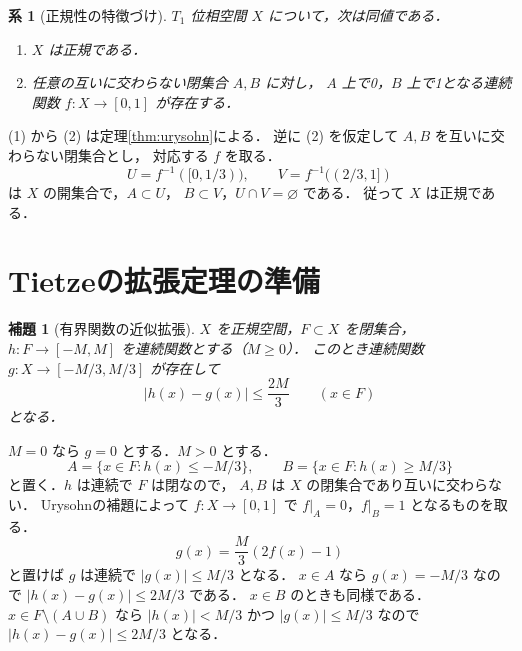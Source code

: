 \documentclass[a5paper,10pt,onecolumn]{jsarticle}
\makeatletter
\theoremstyle{mathnotetheorem}
\newtheorem{lemma}[theorem]{補題}
\newtheorem{corollary}[theorem]{系}
\renewcommand{\proofname}{証明}
\renewenvironment{proof}[1][\proofname]{%
  \par\pushQED{\qed}\normalfont\topsep4\p@\@plus2\p@\relax
  \trivlist\item[\hskip\labelsep\bfseries #1]\ignorespaces
}{\popQED\endtrivlist\@endpefalse}
\makeatother
\begin{document}
\begin{corollary}[正規性の特徴づけ]\label{cor:normal-equiv}
$T_1$ 位相空間 $X$ について，次は同値である．
\begin{enumerate}
\item $X$ は正規である．
\item 任意の互いに交わらない閉集合 $A,B$ に対し，
$A$ 上で0，$B$ 上で1となる連続関数
$f:X\to[0,1]$ が存在する．
\end{enumerate}
\end{corollary}
\begin{proof}
(1) から (2) は定理\ref{thm:urysohn}による．
逆に (2) を仮定して $A,B$ を互いに交わらない閉集合とし，
対応する $f$ を取る．
\[
 U=f^{-1}([0,1/3)),\qquad
 V=f^{-1}((2/3,1])
\]
は $X$ の開集合で，$A\subset U$，
$B\subset V$，$U\cap V=\varnothing$ である．
従って $X$ は正規である．
\end{proof}

\section{Tietzeの拡張定理の準備}

\begin{lemma}[有界関数の近似拡張]\label{lem:approx-extend}
$X$ を正規空間，$F\subset X$ を閉集合，
$h:F\to[-M,M]$ を連続関数とする（$M\ge0$）．
このとき連続関数 $g:X\to[-M/3,M/3]$ が存在して
\[
 |h(x)-g(x)|\le\frac{2M}{3}\qquad(x\in F)
\]
となる．
\end{lemma}
\begin{proof}
$M=0$ なら $g=0$ とする．$M>0$ とする．
\[
 A=\{x\in F:h(x)\le-M/3\},\qquad
 B=\{x\in F:h(x)\ge M/3\}
\]
と置く．$h$ は連続で $F$ は閉なので，
$A,B$ は $X$ の閉集合であり互いに交わらない．
Urysohnの補題によって
$f:X\to[0,1]$ で $f|_A=0$，$f|_B=1$
となるものを取る．
\[
 g(x)=\frac M3(2f(x)-1)
\]
と置けば $g$ は連続で $|g(x)|\le M/3$ となる．
$x\in A$ なら $g(x)=-M/3$ なので
$|h(x)-g(x)|\le2M/3$ である．
$x\in B$ のときも同様である．
$x\in F\setminus(A\cup B)$ なら
$|h(x)|<M/3$ かつ $|g(x)|\le M/3$ なので
$|h(x)-g(x)|\le2M/3$ となる．
\end{proof}
\end{document}
